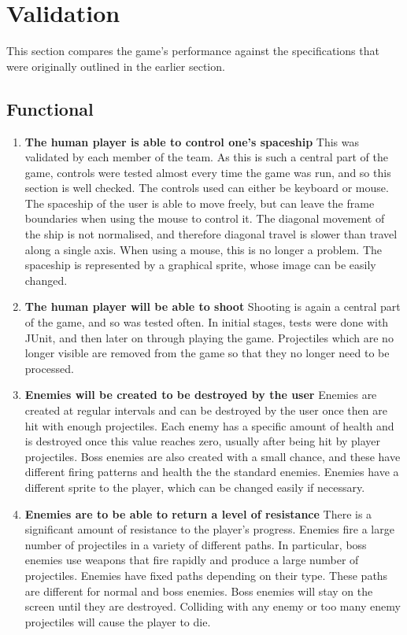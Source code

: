 \section{Validation}
This section compares the game's performance against the specifications that were originally outlined in the earlier section.
\subsection{Functional}
\begin{enumerate}
\item \textbf{The human player is able to control one's spaceship}
This was validated by each member of the team. As this is such a central part of the game, controls were tested almost every time the game was run, and so this section is well checked. The controls used can either be keyboard or mouse. The spaceship of the user is able to move freely, but can leave the frame boundaries when using the mouse to control it. The diagonal movement of the ship is not normalised, and therefore diagonal travel is slower than travel along a single axis. When using a mouse, this is no longer a problem. The spaceship is represented by a graphical sprite, whose image can be easily changed.
\item \textbf{The human player will be able to shoot}
Shooting is again a central part of the game, and so was tested often. In initial stages, tests were done with JUnit, and then later on through playing the game. Projectiles which are no longer visible are removed from the game so that they no longer need to be processed.
\item \textbf{Enemies will be created to be destroyed by the user}
Enemies are created at regular intervals and can be destroyed by the user once then are hit with enough projectiles. Each enemy has a specific amount of health and is destroyed once this value reaches zero, usually after being hit by player projectiles. Boss enemies are also created with a small chance, and these have different firing patterns and health the the standard enemies. Enemies have a different sprite to the player, which can be changed easily if necessary.
\item \textbf{Enemies are to be able to return a level of resistance}
There is a significant amount of resistance to the player's progress. Enemies fire a large number of projectiles in a variety of different paths. In particular, boss enemies use weapons that fire rapidly and produce a large number of projectiles. Enemies have fixed paths depending on their type. These paths are different for normal and boss enemies. Boss enemies will stay on the screen until they are destroyed. Colliding with any enemy or too many enemy projectiles will cause the player to die.

\end{enumerate}
